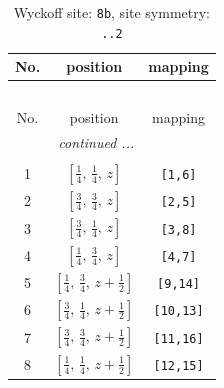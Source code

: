 \documentclass[fleqn,8pt]{jsarticle}
\begin{document}
\begin{longtable}{ccc}
\caption{Wyckoff site: {\tt 8b}, site symmetry: {\tt ..2}}
 \\
 \hline \hline
No. & position & mapping \\ \hline \endfirsthead

\multicolumn{2}{l}{\tablename\ \thetable{}} \\
 \hline \hline
No. & position & mapping \\ \hline \endhead

 \hline \hline
\multicolumn{2}{r}{\footnotesize\it continued ...} \\ \endfoot

 \hline \hline
\multicolumn{2}{r}{} \\ \endlastfoot

1 & $\left[ \frac{1}{4},\, \frac{1}{4},\, z \right]$ & {\tt [1,6]} \\ \hline
2 & $\left[ \frac{3}{4},\, \frac{3}{4},\, z \right]$ & {\tt [2,5]} \\ \hline
3 & $\left[ \frac{3}{4},\, \frac{1}{4},\, z \right]$ & {\tt [3,8]} \\ \hline
4 & $\left[ \frac{1}{4},\, \frac{3}{4},\, z \right]$ & {\tt [4,7]} \\ \hline
5 & $\left[ \frac{1}{4},\, \frac{3}{4},\, z + \frac{1}{2} \right]$ & {\tt [9,14]} \\ \hline
6 & $\left[ \frac{3}{4},\, \frac{1}{4},\, z + \frac{1}{2} \right]$ & {\tt [10,13]} \\ \hline
7 & $\left[ \frac{3}{4},\, \frac{3}{4},\, z + \frac{1}{2} \right]$ & {\tt [11,16]} \\ \hline
8 & $\left[ \frac{1}{4},\, \frac{1}{4},\, z + \frac{1}{2} \right]$ & {\tt [12,15]} \\
\end{longtable}
\renewcommand{\arraystretch}{1.2}
\end{document}
